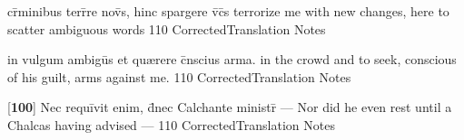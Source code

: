 \latline
  {cr\={\macron {\i}}minibus terr\={}re nov\={\macron {\i}}s, hinc spargere v\={}c\={}s}
  { terrorize me with new changes, here to scatter ambiguous words  }
  {110}
  { CorrectedTranslation }
  { Notes }


\latline
  {in vulgum ambigu\={}s et qu{\ae}rere c\={}nscius arma.}
  { in the crowd and to seek, conscious of his guilt, arms against me. }
  {110}
  { CorrectedTranslation }
  { Notes }


\latline
  {[\textbf{100}] Nec requi\={}vit enim, d\={}nec Calchante ministr\={} ---}
  { Nor did he even rest until a Chalcas having advised --- }
  {110}
  { CorrectedTranslation }
  { Notes }


